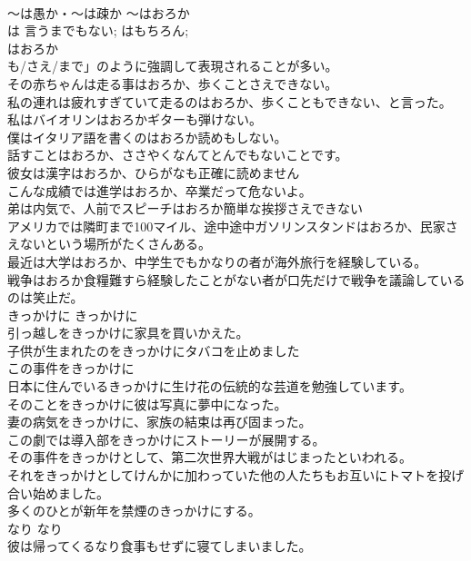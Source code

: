 \documentclass[8pt]{extreport}
\begin{document}
\begin{CJK}{UTF8}{min}
\\	〜は愚か・〜は疎か	〜はおろか	
\\	は 言うまでもない; はもちろん; 
\\	はおろか
\\	も/さえ/まで」のように強調して表現されることが多い。	
\\	その赤ちゃんは走る事はおろか、歩くことさえできない。   
\\	私の連れは疲れすぎていて走るのはおろか、歩くこともできない、と言った。   
\\	私はバイオリンはおろかギターも弾けない。   
\\	僕はイタリア語を書くのはおろか読めもしない。   
\\	話すことはおろか、ささやくなんてとんでもないことです。   
\\	彼女は漢字はおろか、ひらがなも正確に読めません  
\\	こんな成績では進学はおろか、卒業だって危ないよ。  
\\	弟は内気で、人前でスピーチはおろか簡単な挨拶さえできない   
\\	アメリカでは隣町まで100マイル、途中途中ガソリンスタンドはおろか、民家さえないという場所がたくさんある。  
\\	最近は大学はおろか、中学生でもかなりの者が海外旅行を経験している。   
\\	戦争はおろか食糧難すら経験したことがない者が口先だけで戦争を議論しているのは笑止だ。   
\\	きっかけに	きっかけに	
\\	引っ越しをきっかけに家具を買いかえた。  
\\	子供が生まれたのをきっかけにタバコを止めました  
\\	この事件をきっかけに   
\\	日本に住んでいるきっかけに生け花の伝統的な芸道を勉強しています。  
\\	そのことをきっかけに彼は写真に夢中になった。  
\\	妻の病気をきっかけに、家族の結束は再び固まった。   
\\	この劇では導入部をきっかけにストーリーが展開する。  
\\	その事件をきっかけとして、第二次世界大戦がはじまったといわれる。  
\\	それをきっかけとしてけんかに加わっていた他の人たちもお互いにトマトを投げ合い始めました。  
\\	多くのひとが新年を禁煙のきっかけにする。  
\\	なり	なり	
\\	彼は帰ってくるなり食事もせずに寝てしまいました。  

\end{CJK}
\end{document}
